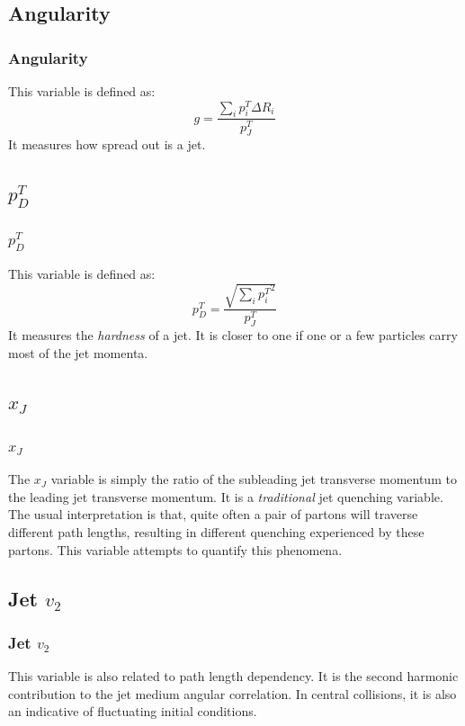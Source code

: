 \documentclass{beamer}
\begin{document}
\subsection{Angularity}

\begin{frame}\frametitle{Angularity}
	This variable is defined as:
	\begin{equation}
		g = \frac{\sum_{i} p_i^{T} \Delta R_i}{p_{J}^{T}}
	\end{equation}
	It measures how spread out is a jet.
\end{frame}

\subsection{$p^T_{D}$}

\begin{frame}\frametitle{$p^T_{D}$}
	This variable is defined as:
	\begin{equation}
		p^T_{D} = \frac{\sqrt{\sum_{i} {p_i^{T}}^2}}{p_{J}^{T}}
	\end{equation}
	It measures the \emph{hardness} of a jet. It is closer to one if one or a few
	particles carry most of the jet momenta.
\end{frame}

\subsection{$x_J$}

\begin{frame}\frametitle{$x_J$}
	The $x_J$ variable is simply the ratio of the subleading jet transverse momentum to the
	leading jet transverse momentum. It is a \emph{traditional} jet quenching variable. 
	The usual interpretation is that, quite often a pair of partons will traverse different
	path lengths, resulting in different quenching experienced by these partons. This
	variable attempts to quantify this phenomena.
\end{frame}

\subsection{Jet $v_2$}

\begin{frame}\frametitle{Jet $v_2$}
	This variable is also related to path length dependency. It is the second harmonic
	contribution to the jet medium angular correlation. In central collisions, it is also
	an indicative of fluctuating initial conditions.
\end{frame}
\end{document}
